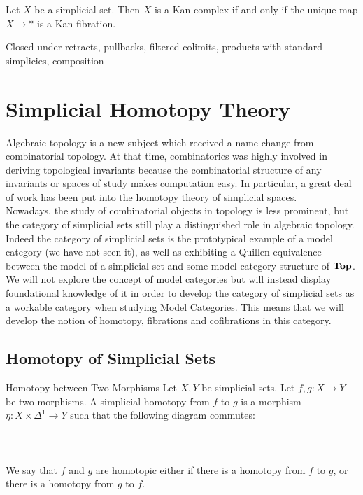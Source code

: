 \documentclass[a4paper]{article}
\begin{document}
\begin{lmm}{}{} Let $X$ be a simplicial set. Then $X$ is a Kan complex if and only if the unique map $X\to\ast$ is a Kan fibration. 
\end{lmm}

Closed under retracts, pullbacks, filtered colimits, products with standard simplicies, composition

\pagebreak
\section{Simplicial Homotopy Theory}
Algebraic topology is a new subject which received a name change from combinatorial topology. At that time, combinatorics was highly involved in deriving topological invariants because the combinatorial structure of any invariants or spaces of study makes computation easy. In particular, a great deal of work has been put into the homotopy theory of simplicial spaces. \\

Nowadays, the study of combinatorial objects in topology is less prominent, but the category of simplicial sets still play a distinguished role in algebraic topology. Indeed the category of simplicial sets is the prototypical example of a model category (we have not seen it), as well as exhibiting a Quillen equivalence between the model of a simplicial set and some model category structure of $\bold{Top}$. We will not explore the concept of model categories but will instead display foundational knowledge of it in order to develop the category of simplicial sets as a workable category when studying Model Categories. This means that we will develop the notion of homotopy, fibrations and cofibrations in this category. 

\subsection{Homotopy of Simplicial Sets}
\begin{defn}{Homotopy between Two Morphisms}{} Let $X,Y$ be simplicial sets. Let $f,g:X\to Y$ be two morphisms. A simplicial homotopy from $f$ to $g$ is a morphism $\eta:X\times\Delta^1\to Y$ such that the following diagram commutes: \\~\\
\\~\\
We say that $f$ and $g$ are homotopic either if there is a homotopy from $f$ to $g$, or there is a homotopy from $g$ to $f$. 
\end{defn}
\end{document}
